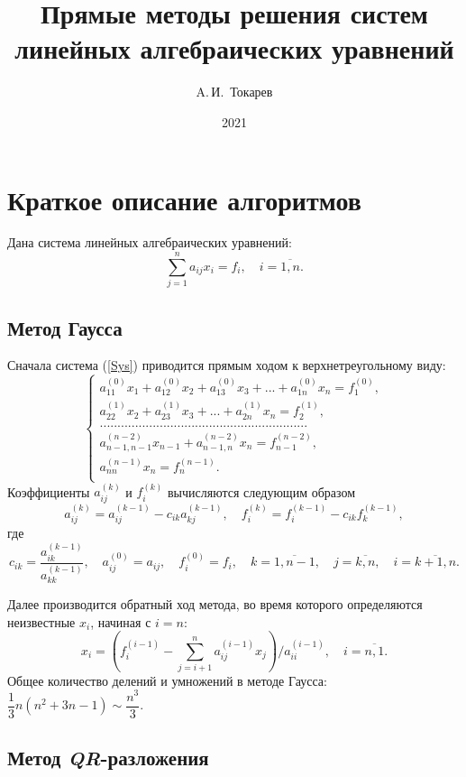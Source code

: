 \documentclass[12pt, a4paper]{article}
\title{Прямые методы решения систем линейных алгебраических уравнений}
\author{A.\,И.~Токарев}
\date{2021}
\def\hmath$#1${\texorpdfstring{{\rmfamily\textit{#1}}}{#1}}
\begin{document}
\maketitle
\tableofcontents 
\newpage

\section{Краткое описание алгоритмов}
Дана система линейных алгебраических уравнений:
\begin{equation}
\sum_{j=1}^{n} a_{ij}x_i = f_i , \quad i = \overline{1,n}.
\label{Sys}
\end{equation}

\subsection{Метод Гаусса}
Сначала система (\ref{Sys}) приводится прямым ходом к верхнетреугольному виду: 
\[\left\{
\begin{aligned}
a_{11}^{(0)}x_1 + a_{12}^{(0)}x_2 + a_{13}^{(0)}x_3 + ... + a_{1n}^{(0)}x_n = f_1^{(0)},\\
a_{22}^{(1)}x_2 + a_{23}^{(1)}x_3 + ... + a_{2n}^{(1)}x_n = f_2^{(1)},\\
...........................................................\\
a_{n-1,n-1}^{(n-2)}x_{n-1} + a_{n-1,n}^{(n-2)}x_n = f_{n-1}^{(n-2)},\\
a_{nn}^{(n-1)}x_n = f_{n}^{(n-1)}.\\
\end{aligned}
\right.
\]
Коэффициенты $a_{ij}^{(k)}$ и $f_i^{(k)}$ вычисляются следующим образом
\[
a_{ij}^{(k)} = a_{ij}^{(k-1)} - c_{ik}a_{kj}^{(k-1)}, \quad f_{i}^{(k)} = f_{i}^{(k-1)} - c_{ik}f_{k}^{(k-1)}, 
\]
где
\[
c_{ik} = \dfrac{a_{ik}^{(k-1)}}{a_{kk}^{(k-1)}}, \quad a_{ij}^{(0)}=a_{ij}, \quad f_{i}^{(0)} = f_i, \quad k = \overline{1,n-1},\quad j =\overline{k,n}, \quad i = \overline{k+1,n}.
\]

Далее производится обратный ход метода, во время которого определяются неизвестные $x_i$, начиная с $i = n$:
\[
x_i =\left(f_i^{(i-1)}-\sum_{j=i+1}^{n} a_{ij}^{(i-1)}x_j\right)/a_{ii}^{(i-1)}, \quad i = \overline{n,1}.
\]
Общее количество делений и умножений в методе Гаусса: $\dfrac{1}{3}n(n^2+3n-1) \sim \dfrac{n^3}{3}$.
\newpage

\subsection {Метод \hmath $QR$-разложения}
\end{document}
